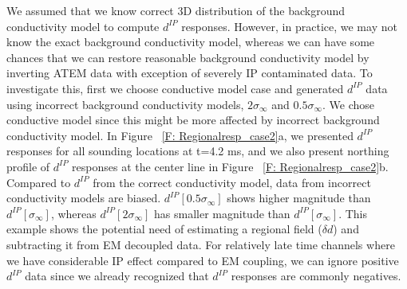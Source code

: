 \documentclass[a4paper, 11pt]{article}
\newcommand{\siginf}{\sigma_\infty}
\newcommand{\dip}{d^{IP}}
\begin{document}
We assumed that we know correct 3D distribution of the background conductivity model to compute $d^{IP}$ responses. However, in practice, we may not know the exact background conductivity model, whereas we can have some chances that we can restore reasonable background conductivity model by inverting ATEM data with exception of severely IP contaminated data. To investigate this, first we choose conductive model case and generated $d^{IP}$ data using incorrect background conductivity models, $2\siginf$ and $0.5\siginf$. We chose conductive model since this might be more affected by incorrect background conductivity model. In Figure ~\ref{F: Regionalresp_case2}a, we presented $d^{IP}$ responses for all sounding locations at t=4.2 ms, and we also present northing profile of $d^{IP}$ responses  at the center line in Figure ~\ref{F: Regionalresp_case2}b.  Compared to $d^{IP}$ from the correct conductivity model, data from incorrect conductivity models are biased. $d^{IP}[0.5\siginf]$ shows higher magnitude than $\dip[\siginf]$, whereas $\dip[2\siginf]$ has smaller magnitude than $\dip[\siginf]$. This example shows the potential need of estimating a regional field ($\delta d$) and subtracting it from EM decoupled data. For relatively late time channels where we have considerable IP effect compared to EM coupling, we can ignore positive $d^{IP}$ data since we already recognized that $d^{IP}$ responses are commonly negatives.
\end{document}
